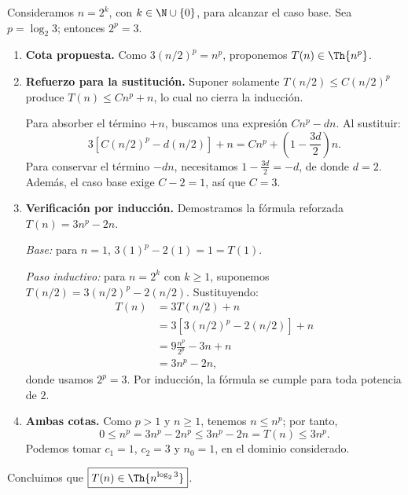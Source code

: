 
Consideramos $n=2^k$, con $k\in\N\cup\{0\}$, para alcanzar el caso base. Sea $p=\log_2 3$; entonces $2^p=3$.

\begin{enumerate}
\item \textbf{Cota propuesta.} Como $3(n/2)^p=n^p$, proponemos $T(n)\in\Th{n^p}$.

\item \textbf{Refuerzo para la sustitución.} Suponer solamente $T(n/2)\le C(n/2)^p$ produce $T(n)\le Cn^p+n$, lo cual no cierra la inducción.

Para absorber el término $+n$, buscamos una expresión $Cn^p-dn$. Al sustituir:
\[
3\left[C(n/2)^p-d(n/2)\right]+n
=Cn^p+\left(1-\frac{3d}{2}\right)n.
\]
Para conservar el término $-dn$, necesitamos $1-\frac{3d}{2}=-d$, de donde $d=2$. Además, el caso base exige $C-2=1$, así que $C=3$.

\item \textbf{Verificación por inducción.} Demostramos la fórmula reforzada $T(n)=3n^p-2n$.

\textit{Base:} para $n=1$, $3(1)^p-2(1)=1=T(1)$.

\textit{Paso inductivo:} para $n=2^k$ con $k\ge1$, suponemos $T(n/2)=3(n/2)^p-2(n/2)$. Sustituyendo:
\[
\begin{aligned}
T(n)
&=3T(n/2)+n\\
&=3\left[3(n/2)^p-2(n/2)\right]+n\\
&=9\frac{n^p}{2^p}-3n+n\\
&=3n^p-2n,
\end{aligned}
\]
donde usamos $2^p=3$. Por inducción, la fórmula se cumple para toda potencia de $2$.

\item \textbf{Ambas cotas.} Como $p>1$ y $n\ge1$, tenemos $n\le n^p$; por tanto,
\[
0\le n^p=3n^p-2n^p
\le 3n^p-2n=T(n)\le3n^p.
\]
Podemos tomar $c_1=1$, $c_2=3$ y $n_0=1$, en el dominio considerado.
\end{enumerate}

Concluimos que $\boxed{T(n)\in\Th{n^{\log_2 3}}}$.
\fin
